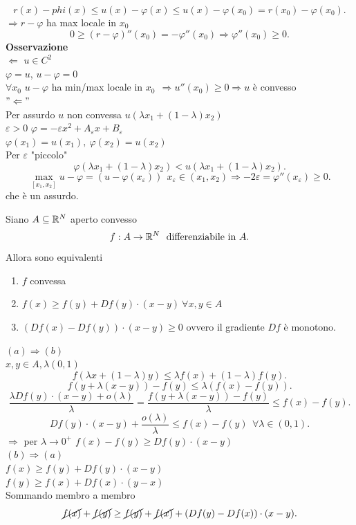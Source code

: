 \documentclass[12px]{article}
\begin{document}
	   \[
	  r(x) -phi(x)\leq  u(x) - \varphi(x)\leq u(x) - \varphi(x_0) = r(x_0) - \varphi(x_0)
	  .\] 
	  $ \Rightarrow  r - \varphi$ ha max locale in $x_0$
	  \[
	  0 \geq (r - \varphi)''(x_0) = -\varphi''(x_0) \Rightarrow \varphi''(x_0)\geq 0
	  .\] 
	  \textbf{Osservazione}\\
	  $ \Leftarrow$ $u\in C^2$\\
	   $ \varphi = u$, $u - \varphi  =0 $\\
	    $\forall x_0$ $u-\varphi$ ha min/max locale in $x_0\ \ \Rightarrow  u''(x_0)\geq 0 \Rightarrow  u$ è convesso\\
	    $" \Leftarrow "$\\
	    Per assurdo  $u$ non convessa $u(\lambda x_1 + (1- \lambda )x_2)$ \\
	    $\varepsilon > 0 $
	    $\varphi = - \varepsilon x^2 + A_\varepsilon x + B_\varepsilon$\\
	    $ \varphi(x_1) = u(x_1), \ \varphi(x_2) = u(x_2)$ \\
	    Per $\varepsilon$ "piccolo"
	     \[
	    \varphi( \lambda x_1 + (1- \lambda)x_2) < u( \lambda x_1 + (1- \lambda)x_2)
	    .\] 
	    \[
		    \max_{[x_1,x_2]}u - \varphi = (u- \varphi(x_\varepsilon))\ \ x_\varepsilon\in(x_1,x_2) \Rightarrow  -2\varepsilon = \varphi''(x_\varepsilon)\geq 0
	    .\] 
	    che è un assurdo.
	    \newpage
	    \begin{teo}
	    Siano $A\subseteq \mathbb{R}^N$ aperto convesso
	     \[
		     f:A \rightarrow \R^N\ \ \text{differenziabile in } A
	    .\] 
	    Allora sono equivalenti
	    \begin{enumerate}
		    \item $f$ convessa
		    \item $f(x)\geq f(y) + Df(y) \cdot(x-y)\ \forall x,y\in A$
		    \item $(Df(x)-Df(y))\cdot(x-y)\geq 0$ ovvero il gradiente $Df$ è monotono.
	    \end{enumerate}
	    \end{teo}
	    \begin{dimo}
	    	$(a) \Rightarrow (b)$ \\
		$x,y\in A, \lambda(0,1)$
		\[
		f( \lambda x + (1 - \lambda)y) \leq \lambda f(x) + (1- \lambda)f (y)
		.\] 
		\[
		f(y + \lambda (x-y)) - f(y) \leq \lambda(f(x)-f(y))
		.\] 
		\[
			\frac{ \lambda Df(y)\cdot (x-y) + o( \lambda)} \lambda= \frac{f(y + \lambda (x-y)) - f(y)} \lambda\leq f(x) - f(y)
		.\] 
		\[
			Df(y)\cdot (x-y) + \frac{ o( \lambda)} \lambda \leq f(x) - f(y)\ \ \forall \lambda\in(0,1)
		.\] 
		$ \Rightarrow  $ per $ \lambda \rightarrow 0^+$ $f(x) - f(y)\geq Df(y)\cdot (x-y)$\\
		 $(b)  \Rightarrow  (a)$\\
		 $f(x)\geq f(y) + D f(y)\cdot (x-y)$\\
		 $f(y)\geq f(x) + Df(x)\cdot (y-x)$\\
		 Sommando membro a membro
		  \[
			  \cancel{f(x)} + \cancel{f(y)} \geq \cancel{f(y)} + \cancel{f(x)} + (Df(y) - Df(x))\cdot (x-y)
		 .\] 
	    \end{dimo}
	    

	
\end{document}
